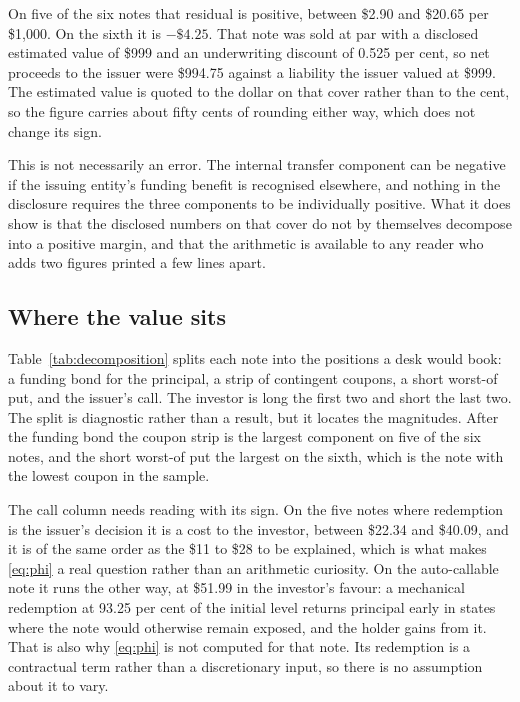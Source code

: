 On five of the six notes that residual is positive, between \$2.90 and \$20.65
per \$1{,}000. On the sixth it is $-\$4.25$. That note was sold at par with a
disclosed estimated value of \$999 and an underwriting discount of 0.525 per
cent, so net proceeds to the issuer were \$994.75 against a liability the
issuer valued at \$999. The estimated value is quoted to the dollar on that
cover rather than to the cent, so the figure carries about fifty cents of
rounding either way, which does not change its sign.

This is not necessarily an error. The internal transfer component can be
negative if the issuing entity's funding benefit is recognised elsewhere, and
nothing in the disclosure requires the three components to be individually
positive. What it does show is that the disclosed numbers on that cover do not
by themselves decompose into a positive margin, and that the arithmetic is
available to any reader who adds two figures printed a few lines apart.

\subsection{Where the value sits}



Table~\ref{tab:decomposition} splits each note into the positions a desk would
book: a funding bond for the principal, a strip of contingent coupons, a short
worst-of put, and the issuer's call. The investor is long the first two and
short the last two. The split is diagnostic rather than a result,
but it locates the magnitudes. After the funding bond the coupon strip is the
largest component on five of the six notes, and the short worst-of put the
largest on the sixth, which is the note with the lowest coupon in the sample.

The call column needs reading with its sign. On the five notes where redemption
is the issuer's decision it is a cost to the investor, between \$22.34 and
\$40.09, and it is of the same order as the \$11 to \$28 to be explained,
which is what makes \eqref{eq:phi} a real question rather than an arithmetic
curiosity. On the auto-callable note it runs the other way, at \$51.99 in the
investor's favour: a mechanical redemption at 93.25 per cent of the initial
level returns principal early in states where the note would otherwise remain
exposed, and the holder gains from it. That is also why \eqref{eq:phi} is not
computed for that note. Its redemption is a contractual term rather than a
discretionary input, so there is no assumption about it to vary.

